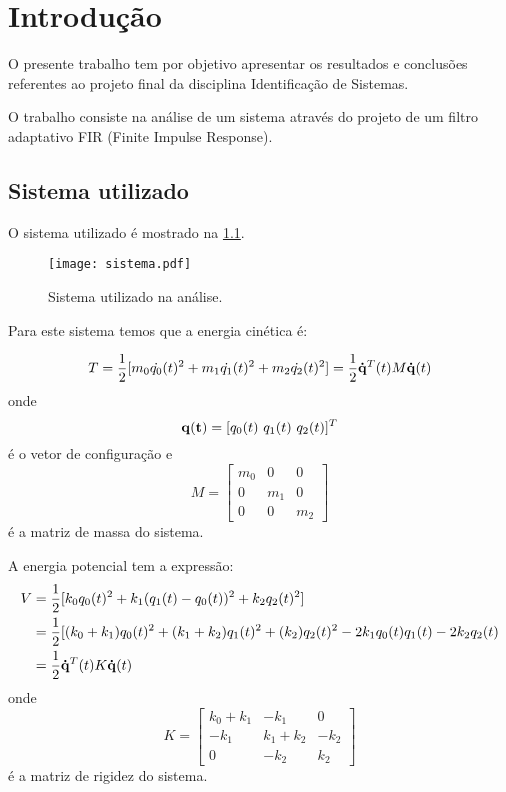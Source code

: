 \chapter{Introdução}

O presente trabalho tem por objetivo apresentar os resultados e conclusões referentes ao projeto final da disciplina Identificação de Sistemas.

O trabalho consiste na análise de um sistema através do projeto de um filtro adaptativo  FIR (Finite Impulse Response). 

\section{Sistema utilizado}

O sistema utilizado é mostrado na \cref{fig:sistema}. 

\begin{figure}[!h]
	\centering
	\texttt{[image: sistema.pdf]}
	\caption{Sistema utilizado na análise.}
	\label{fig:sistema}
\end{figure}

Para este sistema temos que a energia cinética é:

\begin{equation}
T 
= \frac{1}{2}[m_0\dot{q_0}(t)^2 + m_1\dot{q_1}(t)^2 + m_2\dot{q_2}(t)^2] 
= \frac{1}{2}{\bf \dot{q}}^T(t)M{\bf \dot{q}}(t)
\end{equation}
onde 
\begin{equation*}
{\bf q(t)} = [q_0(t) \  q_1(t) \ q_2(t)]^T
\end{equation*}
é o vetor de configuração e
\begin{equation*}
M = 
\begin{bmatrix} 
m_0 & 0 & 0\\
0 & m_1 & 0 \\
0 & 0 & m_2
\end{bmatrix}
\end{equation*}  
é a matriz de massa do sistema.

A energia potencial tem a expressão:
\begin{equation}
\begin{split}
V &= \frac{1}{2}[k_0 q_0(t)^2 + k_1(q_1(t) - q_0(t))^2 + k_2 q_2(t)^2] \\
&= \frac{1}{2}[(k_0+k_1)q_0(t)^2 + (k_1+k_2)q_1(t)^2 + (k_2)q_2(t)^2 -2k_1  q_0(t)q_1(t) - 2k_2 q_2(t) \\
&= \frac{1}{2}{\bf \dot{q}}^T(t) K  {\bf \dot{q}}(t)
\end{split}
\end{equation}
onde
\begin{equation*}
K = 
\begin{bmatrix} 
k_0 +k_1 & -k_1 & 0\\
-k_1 & k_1+k_2 & -k_2 \\
0 & -k_2 & k_2
\end{bmatrix}
\end{equation*}   
é a matriz de rigidez do sistema.

